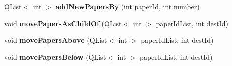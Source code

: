 \begin{DoxyCompactItemize}
\item 
Q\+List$<$ int $>$ {\bfseries add\+New\+Papers\+By} (int paper\+Id, int number)\hypertarget{class_p_l_m_tree_aec5b6658b0b45988ec4f69bfba1a4ac4}{}\label{class_p_l_m_tree_aec5b6658b0b45988ec4f69bfba1a4ac4}

\item 
void {\bfseries move\+Papers\+As\+Child\+Of} (Q\+List$<$ int $>$ paper\+Id\+List, int dest\+Id)\hypertarget{class_p_l_m_tree_a3a316ce33f1affda29b08da509603cc4}{}\label{class_p_l_m_tree_a3a316ce33f1affda29b08da509603cc4}

\item 
void {\bfseries move\+Papers\+Above} (Q\+List$<$ int $>$ paper\+Id\+List, int dest\+Id)\hypertarget{class_p_l_m_tree_a8779975366d60197cb164d8992fc5753}{}\label{class_p_l_m_tree_a8779975366d60197cb164d8992fc5753}

\item 
void {\bfseries move\+Papers\+Below} (Q\+List$<$ int $>$ paper\+Id\+List, int dest\+Id)\hypertarget{class_p_l_m_tree_a830691cee97b31eedf435a449825463a}{}\label{class_p_l_m_tree_a830691cee97b31eedf435a449825463a}

\end{DoxyCompactItemize}
